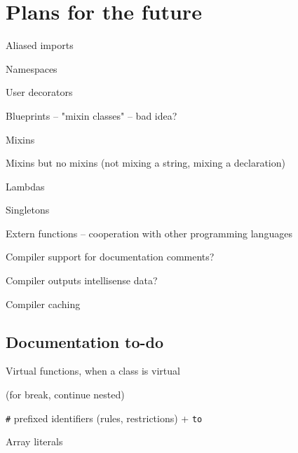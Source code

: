 \chapter{Plans for the future}
\begin{compactitem}
	\item Aliased imports
	\item Namespaces
	\item User decorators
	\item Blueprints -- "mixin classes" -- bad idea?
	\item Mixins
	\item Mixins but no mixins (not mixing a string, mixing a declaration)
	\item Lambdas
	\item Singletons
	\item Extern functions -- cooperation with other programming languages
	\item Compiler support for documentation comments?
	\item Compiler outputs intellisense data?
	\item Compiler caching
\end{compactitem}

\section{Documentation to-do}
\begin{compactitem}
	\item Virtual functions, when a class is virtual
	\item {}
	\item {} (for break, continue nested)
	\item {}
	\item \verb|#| prefixed identifiers (rules, restrictions) + \verb|to|
	\item {}
	\item Array literals
\end{compactitem}

